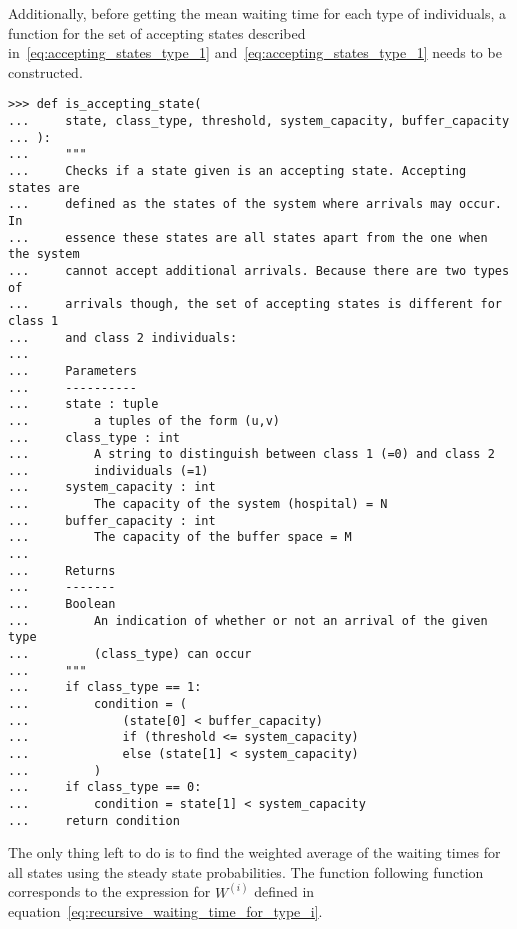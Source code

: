 Additionally, before getting the mean waiting time for each type of individuals,
a function for the set of accepting states described
in~\eqref{eq:accepting_states_type_1} and~\eqref{eq:accepting_states_type_1}
needs to be constructed.

\begin{lstlisting}[style=pystyle]
>>> def is_accepting_state(
...     state, class_type, threshold, system_capacity, buffer_capacity
... ):
...     """
...     Checks if a state given is an accepting state. Accepting states are
...     defined as the states of the system where arrivals may occur. In
...     essence these states are all states apart from the one when the system
...     cannot accept additional arrivals. Because there are two types of
...     arrivals though, the set of accepting states is different for class 1
...     and class 2 individuals:
... 
...     Parameters
...     ----------
...     state : tuple
...         a tuples of the form (u,v)
...     class_type : int
...         A string to distinguish between class 1 (=0) and class 2
...         individuals (=1)
...     system_capacity : int
...         The capacity of the system (hospital) = N
...     buffer_capacity : int
...         The capacity of the buffer space = M
... 
...     Returns
...     -------
...     Boolean
...         An indication of whether or not an arrival of the given type
...         (class_type) can occur
...     """
...     if class_type == 1:
...         condition = (
...             (state[0] < buffer_capacity)
...             if (threshold <= system_capacity)
...             else (state[1] < system_capacity)
...         )
...     if class_type == 0:
...         condition = state[1] < system_capacity
...     return condition

\end{lstlisting}

The only thing left to do is to find the weighted average of the waiting times
for all states using the steady state probabilities.
The function following function corresponds to the expression for \(W^{(i)}\)
defined in equation~\eqref{eq:recursive_waiting_time_for_type_i}.

